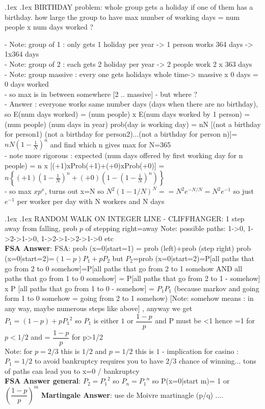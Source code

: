 \documentclass[10pt,landscape,a4paper]{article}
\makeatletter
\renewcommand{\section}{\@startsection{section}{1}{0mm}%
                                {.1ex}%
                                {.1ex}%
                                {\color{blue}\sffamily\small\bfseries}}
\makeatother
\begin{document}
\begin{multicols*}{3}
\begin{spacing}{0.1}
\section{BIRTHDAY problem: whole group gets a holiday if one of them has a birthday. how large the group to have max number of working days = num people x num days worked ?}

- Note: group of 1 : only gets 1 holiday per year -> 1 person works 364 days -> 1x364 days\\
- Note: group of 2 : each gets 2 holiday per year -> 2 people work 2 x 363 days\\
- Note: group massive : every one gets holidays whole time-> massive x 0 days = 0 days worked\\
- so max is in between somewhere [2 .. massive] - but where ?\\
- Answer : everyone works same number days (days when there are no birthday), so E(num days worked) = (num people) x E(num days worked by 1 person) = (num people) (num days in year) prob(day is working day) = nN [(not a birthday for person1) (not a birthday for person2)...(not a birthday for person n)]= $nN { ( 1-\frac{1}{N})}^{n}$ and find which n gives max for N=365\\
- note more rigorous : expected (num days offered by first working day for n people) = n x  [(+1)xProb(+1)+(+0)xProb(+0)] = $n \left\{ (+1){ \left(1-\frac{1}{N} \right )}^n  + (+0) \left( 1-{(1-\frac{1}{N})}^n  \right) \right \}$\\
- so max $xp^x$, turns out x=N so $N^2{(1-1/N)}^N ==N^2 e^{-N/N}=N^2 e^{-1}$ so just $e^{-1}$ per worker per day with N workers and N days 

\section{RANDOM WALK ON INTEGER LINE - CLIFFHANGER: 1 step away from falling, prob $p$ of stepping right=away}
Note: possible paths: 1->0, 1->2->1->0, 1->2->1->2->1->0 etc\\
\textbf{FSA Answer}: FSA: prob (x=0|start=1) = prob (left)+prob (step right) prob (x=0|start=2)=$(1-p)P_1+pP_2$ but  $P_2$=prob (x=0|start=2)=P[all paths that go from 2 to 0 somehow]=P[all paths that go from 2 to 1 somehow AND all paths that go from 1 to 0 somehow] = P[all paths that go from 2 to 1 - somehow] x P [all paths that go from 1 to 0 - somehow] = $P_1 P_1$ (because markov and going form 1 to 0 somehow = going from 2 to 1 somehow) [Note: somehow means : in any way, maybe numerous steps like above] , anyway we get $P_1 = (1-p)+p {P_1}^2$ so $P_1$ is either $1$ or $\dfrac{1-p}{p}$ and P must be <1 hence =1 for $p<1/2$ and = $\dfrac{1-p}{p}$ for p>1/2\\
Note: for $p=2/3$ this is $1/2$ and $p=1/2$ this is $1$ - implication for casino : $P_1=1/2$ to avoid bankruptcy requires you to have 2/3 chance of winning... tons of paths can lead you to x=0 / bankruptcy \\
\textbf{FSA Answer general}: $P_2={P_1}^2$ so $P_n={P_1}^n$ so P(x=0|start m)= 1 or ${(\dfrac{1-p}{p})}^m$
\textbf{Martingale Answer}: use de Moivre martinagle (p/q) ....


\end{spacing}
\end{multicols*}
\end{document}
